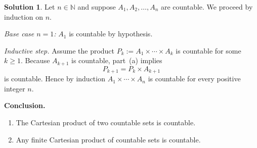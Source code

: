 \documentclass[12pt]{article}
\theoremstyle{definition} %
\newtheorem{solution}{Solution}
\theoremstyle{plain} %
\begin{document}
\begin{solution}
  \smallskip
  Let $n\in\mathbb{N}$ and suppose
  $A_1,A_2,\dots,A_n$ are countable.
  We proceed by induction on $n$.
  
  \smallskip
  \emph{Base case $n=1$:} $A_1$ is countable by hypothesis.
  
  \smallskip
  \emph{Inductive step.}
  Assume the product
  \(
     P_{k}:=A_1\times\cdots\times A_k
  \)
  is countable for some $k\ge1$.
  Because $A_{k+1}$ is countable, part~(a) implies
  \[
     P_{k+1}=P_k\times A_{k+1}
  \]
  is countable.
  Hence by induction $A_1\times\cdots\times A_n$ is countable for every
  positive integer $n$.
  
  \bigskip
  \textbf{Conclusion.}
  \begin{enumerate}[label=\textbullet]
    \item The Cartesian product of two countable sets is countable.
    \item Any finite Cartesian product of countable sets is countable.
  \end{enumerate}
  \end{solution}
\end{document}
